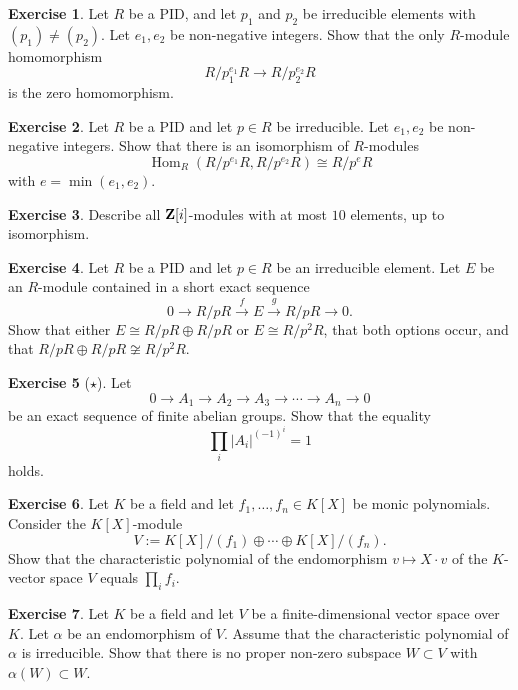 \documentclass[11pt]{amsbook}
\newcommand{\longto}{\longrightarrow}
\DeclareMathOperator\Hom{Hom}
\theoremstyle{plain}
\theoremstyle{definition}
\newtheorem{exercise}{Exercise}
\begin{document}
\begin{exercise}
Let $R$ be a PID, and let $p_1$ and $p_2$ be irreducible elements with $(p_1) \neq (p_2)$. Let $e_1,e_2$ be non-negative integers. Show that the only $R$-module homomorphism
\[
	R/p_1^{e_1}R \to R/p_2^{e_2}R
\]
is the zero homomorphism. 
\end{exercise}

\begin{exercise}
Let $R$ be a PID and let $p\in R$ be irreducible. Let $e_1,e_2$ be non-negative integers. Show that there is an isomorphism of
 $R$-modules
\[
	\Hom_R(R/p^{e_1}R,R/p^{e_2}R) \cong R/p^e R
\]
with $e=\min(e_1,e_2)$.
\end{exercise}

\begin{exercise}
Describe all ${\mathbf{Z}}[i]$-modules with at most $10$ elements, up to isomorphism.
\end{exercise}

\begin{exercise}
Let $R$ be a PID and let $p \in R$ be an irreducible element. Let $E$ be an $R$-module contained in a short exact sequence
\[
	0 \longto R/pR \overset{f}{\longto} E \overset{g}{\longto} R/pR \longto 0.
\]
Show that either $E \cong R/pR \oplus R/pR$ or $E\cong R/p^2R$, that both options occur, and that 
$R/pR \oplus R/pR \not\cong R/p^2R$.
\end{exercise}

\begin{exercise}[$\star$]
Let
\[
	0 \longto A_1 \longto A_2 \longto A_3 \longto \cdots \longto A_n \longto 0
\]
be an exact sequence of finite abelian groups. Show that the equality
\[
	\prod_i |A_i|^{(-1)^{i}} = 1
\]
holds.
\end{exercise}

\begin{exercise}
Let $K$ be a field and let $f_1,\ldots, f_n \in K[X]$ be monic polynomials. Consider the $K[X]$-module
\[
	V := K[X]/(f_1) \oplus \cdots \oplus K[X]/(f_n).
\]
Show that the characteristic polynomial of the endomorphism $v\mapsto X\cdot v$ of the $K$-vector space $V$ equals $\prod_i f_i$.
\end{exercise}

\begin{exercise}
Let $K$ be a field and let $V$ be a finite-dimensional vector space over $K$. Let $\alpha$ be an endomorphism of $V$. 
Assume that the characteristic polynomial of $\alpha$ is irreducible. Show that there is no proper non-zero subspace $W\subset V$ with $\alpha(W) \subset W$.
\end{exercise}
\end{document}
